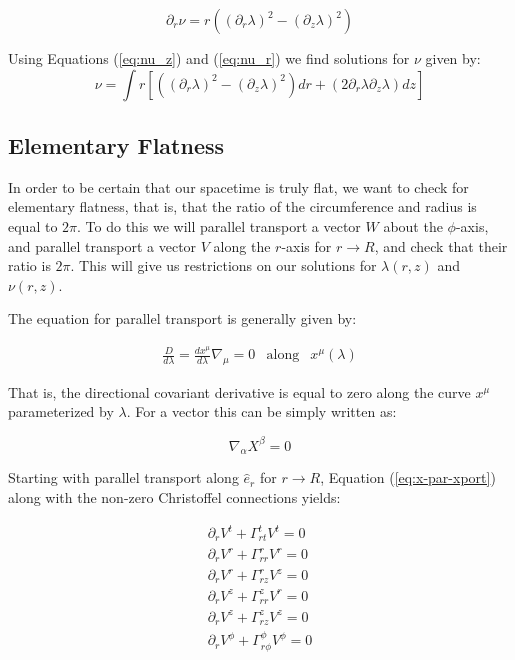 \documentclass{article}
\begin{document}
\begin{equation}
\partial_{r}\nu=r\left(\left(\partial_{r}\lambda\right)^{2}-\left(\partial_{z}\lambda\right)^{2}\right)\label{eq:nu_r}
\end{equation}

Using Equations (\ref{eq:nu_z}) and (\ref{eq:nu_r}) we find solutions for $\nu$ given by:
\begin{equation}
\nu=\int r[\left(\left(\partial_{r}\lambda\right)^{2}-\left(\partial_{z}\lambda\right)^{2}\right)dr+\left(2\partial_{r}\lambda\partial_{z}\lambda\right)dz]\label{eq:nu}
\end{equation}

\subsection{Elementary Flatness}

In order to be certain that our spacetime is truly flat, we want to check for elementary flatness, that is, that the ratio of the circumference and radius is equal to $2\pi$. To do this we will parallel transport a vector $W$ about the $\phi$-axis, and parallel transport a vector $V$ along the $r$-axis for $r\rightarrow R$, and check that their ratio is $2\pi$. This will give us restrictions on our solutions for $\lambda\left(r,z\right)$ and $\nu\left(r,z\right)$.

The equation for parallel transport is generally given by:

\begin{equation}
\begin{array}{rcl} \frac{D}{d\lambda}=\frac{dx^{\mu}}{d\lambda}\nabla_{\mu}=0 & \mbox{along} & x^{\mu}\left(\lambda\right)
\end{array}
\end{equation}

That is, the directional covariant derivative is equal to zero along the curve $x^{\mu}$ parameterized by $\lambda$. For a vector this can be simply written as:

\begin{equation}
\nabla_{\alpha}X^{\beta}=0\label{eq:x-par-xport}
\end{equation}

Starting with parallel transport along $\hat{e}_{r}$ for $r\rightarrow R$, Equation (\ref{eq:x-par-xport}) along with the non-zero Christoffel connections yields:

\begin{equation}
\begin{array}{r}
\partial_{r}V^{t}+\Gamma^{t}_{rt}V^{t}=0\\
\partial_{r}V^{r}+\Gamma^{r}_{rr}V^{r}=0\\
\partial_{r}V^{r}+\Gamma^{r}_{rz}V^{z}=0\\
\partial_{r}V^{z}+\Gamma^{z}_{rr}V^{r}=0\\
\partial_{r}V^{z}+\Gamma^{z}_{rz}V^{z}=0\\
\partial_{r}V^{\phi}+\Gamma^{\phi}_{r\phi}V^{\phi}=0\\
\end{array}
\end{equation}
\end{document}
